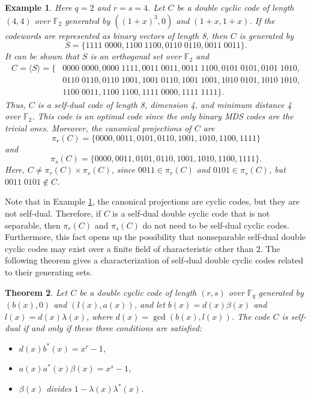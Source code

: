 \documentclass[12pt]{article}
\newtheorem{theorem}{Theorem}[section]
\newtheorem{example}[theorem]{Example}
\begin{document}
	\begin{example}\label{exsddc1}
		Here $q=2$ and $r=s=4$. Let $C$ be a double cyclic code of length $(4,4)$ over $\mathbb{F}_2$ %
		generated by $((1+x)^3,0)$ and $(1+x,1+x)$. If the codewords are represented as binary vectors of length 8, then $C$ is generated by $$S=\{1111\;0000,1100\;1100,0110\;0110,0011\;0011\}.$$
		It can be shown that $S$ is an orthogonal set over $\mathbb{F}_2$ and
		\begin{align*}
			C=\langle S\rangle=\{&0000\;0000,0000\;1111,0011\;0011,0011\;1100,0101\;0101,0101\;1010,\\
			& 0110\;0110,0110\;1001,1001\;0110,1001\;1001,1010\;0101,1010\;1010,\\
			& 1100\;0011,1100\;1100,1111\;0000,1111\;1111\}.
		\end{align*}
		Thus, $C$ is a self-dual code of length 8, dimension 4, and minimum distance 4 over $\mathbb{F}_2$. This code is an optimal code since the only binary MDS codes are the trivial ones. Moreover, the canonical projections of $C$ are
		$$\pi_r(C)=\{0000,0011,0101,0110,1001,1010,1100,1111\}$$ and
		$$\pi_s(C)=\{0000,0011,0101,0110,1001,1010,1100,1111\}.$$
		Here, $C\neq \pi_r(C)\times\pi_s(C)$, since $0011\in\pi_r(C)$ and $0101\in\pi_s(C)$, but $0011\;0101\notin C$.
	\end{example}
	Note that in Example \ref{exsddc1}, the canonical projections are cyclic codes, but they are not self-dual. Therefore, if $C$ is a self-dual double cyclic code that is not separable, then $\pi_r(C)$ and $\pi_s(C)$ do not need to be self-dual cyclic codes.
	Furthermore, this fact opens up the possibility that nonseparable self-dual double cyclic codes may exist over a finite field of characteristic other than 2. The following theorem gives a characterization of self-dual double cyclic codes related to their generating sets.
	\begin{theorem}\label{charsddc}
		Let $C$ be a double cyclic code of length $(r,s)$ over $\mathbb{F}_q$ generated by $(b(x),0)$ and $(l(x),a(x))$, and let $b(x)=d(x)\beta(x)$ and $l(x)=d(x)\lambda(x)$, where $d(x)=\gcd(b(x),l(x))$. The code $C$ is self-dual if and only if these three conditions are satisfied:
		\begin{itemize}
			\item $d(x) b^{*}(x) = x^r-1$,
			\item $a(x)a^{*}(x)\beta(x)=x^s-1$,
			\item $\beta(x)$ divides $1-\lambda(x)\lambda^{*}(x)$.
		\end{itemize}
	\end{theorem}
\end{document}
